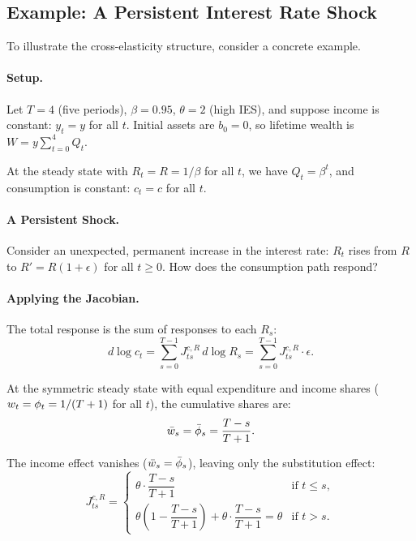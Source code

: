 \subsection{Example: A Persistent Interest Rate Shock}
\label{subsec:T-example}

To illustrate the cross-elasticity structure, consider a concrete example.

\paragraph{Setup.}
Let $T = 4$ (five periods), $\beta = 0.95$, $\theta = 2$ (high IES), and suppose income is constant: $y_t = y$ for all $t$. Initial assets are $b_0 = 0$, so lifetime wealth is $W = y \sum_{t=0}^{4} Q_t$.

At the steady state with $R_t = R = 1/\beta$ for all $t$, we have $Q_t = \beta^t$, and consumption is constant: $c_t = c$ for all $t$.

\paragraph{A Persistent Shock.}
Consider an unexpected, permanent increase in the interest rate: $R_t$ rises from $R$ to $R' = R(1 + \epsilon)$ for all $t \geq 0$. How does the consumption path respond?

\paragraph{Applying the Jacobian.}
The total response is the sum of responses to each $R_s$:
\begin{equation}
d \log c_t = \sum_{s=0}^{T-1} J^{c,R}_{ts} \, d \log R_s = \sum_{s=0}^{T-1} J^{c,R}_{ts} \cdot \epsilon.
\label{eq:persistent-shock}
\end{equation}

At the symmetric steady state with equal expenditure and income shares ($w_t = \phi_t = 1/(T+1)$ for all $t$), the cumulative shares are:
\begin{equation}
\bar{w}_s = \bar{\phi}_s = \frac{T - s}{T + 1}.
\label{eq:symmetric-cumulative}
\end{equation}

The income effect vanishes ($\bar{w}_s = \bar{\phi}_s$), leaving only the substitution effect:
\begin{equation}
J^{c,R}_{ts} = \begin{cases} \theta \cdot \dfrac{T - s}{T + 1} & \text{if } t \leq s, \\[8pt] \theta \left( 1 - \dfrac{T - s}{T + 1} \right) + \theta \cdot \dfrac{T - s}{T + 1} = \theta & \text{if } t > s. \end{cases}
\label{eq:symmetric-jacobian}
\end{equation}

